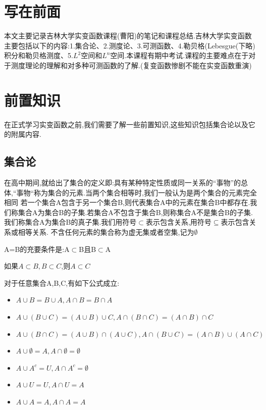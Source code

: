 \section*{写在前面}
本文主要记录吉林大学实变函数课程(曹阳)的笔记和课程总结.吉林大学实变函数主要包括以下的内容:1.集合论、2.测度论、3.可测函数、4.勒贝格(Lebesgue(下略)积分和勒贝格测度、5.\(L^2\)空间和\(L^n\)空间.本课程有期中考试.课程的主要难点在于对于测度理论的理解和对多种可测函数的了解.(复变函数惨剧不能在实变函数重演)
\section{前置知识}
在正式学习实变函数之前,我们需要了解一些前置知识,这些知识包括集合论以及它的附属内容.
\subsection{集合论}
在高中期间,就给出了集合的定义即:具有某种特定性质或同一关系的“事物”的总体,“事物“称为集合的元素.当两个集合相等时,我们一般认为是两个集合的元素完全相同
若一个集合A包含于另一个集合B,则代表集合A中的元素在集合B中都存在.我们称集合A为集合B的子集.若集合A不包含于集合B,则称集合A不是集合B的子集.我们称集合A为集合B的真子集.我们用符号\(\subset\)表示包含关系,用符号\(\subseteq\)表示包含关系或相等关系.
不含任何元素的集合称为虚无集或者空集,记为\(\emptyset\) 
\begin{Theorem}
    A=B的充要条件是:A\(\subset\)B且B\(\subset\)A    
\end{Theorem}
\begin{Theorem}
    如果\(A \subset B ,B \subset C\),则\(A \subset C\)
\end{Theorem}
\begin{Theorem}
    对于任意集合A,B,C,有如下公式成立:
    \begin{itemize}[itemsep=2pt,topsep=0pt,parsep=0pt]
        \item \(A \cup B = B \cup A , A \cap B = B \cap A\) \\
        \item \(A \cup (B \cup C) = (A \cup B) \cup C , A \cap (B \cap C) = (A \cap B) \cap C\) \\
        \item \(A \cup (B \cap C) = (A \cup B) \cap (A \cup C) , A \cap (B \cup C) = (A \cap B) \cup (A \cap C)\) \\
        \item \(A \cup \emptyset = A , A \cap \emptyset = \emptyset\) \\
        \item \(A \cup A^c = U , A \cap A^c = \emptyset\) \\
        \item \(A \cup U = U , A \cap U = A\) \\
        \item \(A \cup A =A , A \cap A = A\) \\
    \end{itemize}
\end{Theorem}
